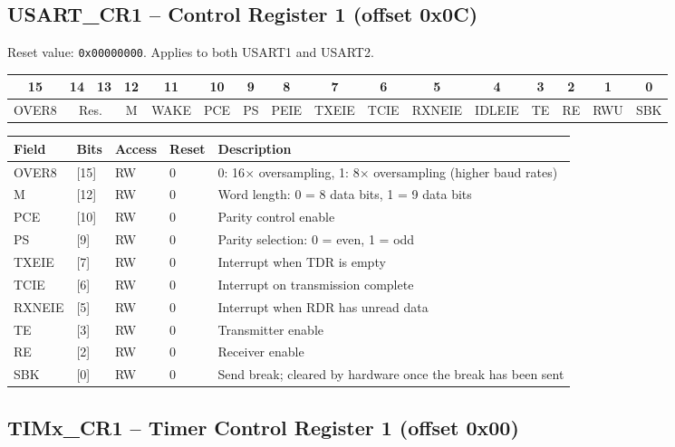 \documentclass[11pt,a4paper,parskip=half]{scrartcl}
\begin{document}
\subsection{USART\_CR1 -- Control Register 1 (offset 0x0C)}

Reset value: \texttt{0x00000000}. Applies to both USART1 and USART2.

\begin{center}
\small
\begin{tabular}{|*{16}{c|}}
\hline
15 & 14 & 13 & 12 & 11 & 10 & 9 & 8 & 7 & 6 & 5 & 4 & 3 & 2 & 1 & 0 \\
\hline
OVER8 & \multicolumn{2}{c|}{Res.} & M & WAKE & PCE & PS & PEIE & TXEIE & TCIE & RXNEIE & IDLEIE & TE & RE & RWU & SBK \\
\hline
\end{tabular}
\end{center}

\begin{center}
\begin{tabularx}{\textwidth}{@{}l l l l Y@{}}
\toprule
\textbf{Field} & \textbf{Bits} & \textbf{Access} & \textbf{Reset} & \textbf{Description} \\
\midrule
OVER8 & [15] & RW & 0 & 0: 16$\times$ oversampling, 1: 8$\times$ oversampling (higher baud rates) \\
M & [12] & RW & 0 & Word length: 0 = 8 data bits, 1 = 9 data bits \\
PCE & [10] & RW & 0 & Parity control enable \\
PS & [9] & RW & 0 & Parity selection: 0 = even, 1 = odd \\
TXEIE & [7] & RW & 0 & Interrupt when TDR is empty \\
TCIE & [6] & RW & 0 & Interrupt on transmission complete \\
RXNEIE & [5] & RW & 0 & Interrupt when RDR has unread data \\
TE & [3] & RW & 0 & Transmitter enable \\
RE & [2] & RW & 0 & Receiver enable \\
SBK & [0] & RW & 0 & Send break; cleared by hardware once the break has been sent \\
\bottomrule
\end{tabularx}
\end{center}

\subsection{TIMx\_CR1 -- Timer Control Register 1 (offset 0x00)}
\end{document}
